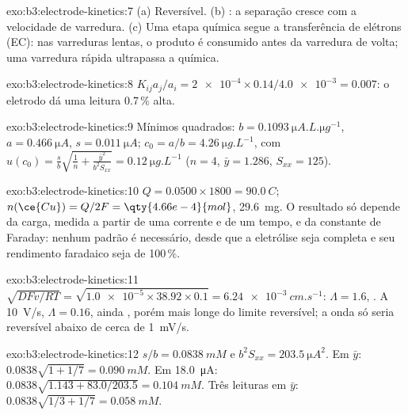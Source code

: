 \begin{solution}{exo:b3:electrode-kinetics:7}
(a) Reversível. (b) : a separação cresce com a velocidade de varredura.
(c) Uma etapa química segue a transferência de elétrons (EC): nas varreduras lentas, o
produto é consumido antes da varredura de volta; uma varredura rápida ultrapassa a química.
\end{solution}

\begin{solution}{exo:b3:electrode-kinetics:8}
$K_{ij}a_j/a_i = \num{2e-4} \times 0.14/\num{4.0e-3} = 0.007$: o eletrodo dá uma leitura 0.7\,\% alta.
\end{solution}

\begin{solution}{exo:b3:electrode-kinetics:9}
Mínimos quadrados: $b = \qty{0.1093}{\micro A.L.\micro g^{-1}}$, $a = \qty{0.466}{\micro A}$, $s = \qty{0.011}{\micro A}$; $c_0 = a/b =
\qty{4.26}{\micro g.L^{-1}}$, com $u(c_0) = \frac sb\sqrt{\frac1n + \frac{\bar y^2}{b^2S_{xx}}} = \qty{0.12}{\micro g.L^{-1}}$
($n = 4$, $\bar y = 1.286$, $S_{xx} = 125$).
\end{solution}

\begin{solution}{exo:b3:electrode-kinetics:10}
$Q = 0.0500 \times 1800 = \qty{90.0}{C}$; $n(\ce{Cu}) = Q/2F = \qty{4.66e-4}{mol}$, \qty{29.6}{mg}. O
resultado só depende da carga, medida a partir de uma corrente e de um tempo, e da
constante de Faraday: nenhum padrão é necessário, desde que a eletrólise seja
completa e seu rendimento faradaico seja de 100\,\%.
\end{solution}

\begin{solution}{exo:b3:electrode-kinetics:11}
$\sqrt{DFv/RT} = \sqrt{\num{1.0e-5} \times 38.92 \times 0.1} = \qty{6.24e-3}{cm.s^{-1}}$: $\Lambda = 1.6$, .
A \qty{10}{V/s}, $\Lambda = 0.16$, ainda , porém mais longe do limite
reversível; a onda só seria reversível abaixo de cerca de \qty{1}{mV/s}.
\end{solution}

\begin{solution}{exo:b3:electrode-kinetics:12}
$s/b = \qty{0.0838}{mM}$ e $b^2S_{xx} = \qty{203.5}{\micro A^2}$. Em $\bar y$: $0.0838\sqrt{1 + 1/7} = \qty{0.090}{mM}$.
Em \qty{18.0}{\micro A}: $0.0838\sqrt{1.143 + 83.0/203.5} = \qty{0.104}{mM}$. Três leituras em $\bar y$:
$0.0838\sqrt{1/3 + 1/7} = \qty{0.058}{mM}$.
\end{solution}

